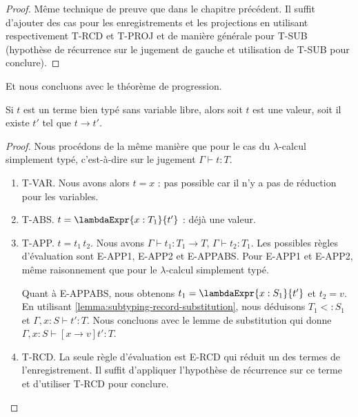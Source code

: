 \begin{proof}
  Même technique de preuve que dans le chapitre précédent. Il suffit d'ajouter 
  des cas pour les enregistrements et les projections en utilisant
  respectivement T-RCD et T-PROJ et de manière générale pour T-SUB (hypothèse de
  récurrence sur le jugement de gauche et utilisation de T-SUB pour conclure).
\end{proof}

Et nous concluons avec le théorème de progression.

\begin{theorem} 
  Si $t$ est un terme bien typé sans variable libre, alors soit $t$ est une
  valeur, soit il existe $t'$ tel que $t \rightarrow t'$.
\end{theorem}

\begin{proof}
  Nous procédons de la même manière que pour le cas du $\lambda$-calcul
  simplement typé, c'est-à-dire sur le jugement $\Gamma \vdash t : T$.
  \begin{enumerate}
    \item T-VAR. Nous avons alors $t = x$ : pas possible car il n'y a pas de
      réduction pour les variables.
      \item T-ABS. $t = \lambdaExpr{x : T_{1}}{t'}$ : déjà une valeur.
      \item T-APP. $t = t_{1} \, t_{2}$. Nous avons
          $\Gamma \vdash t_{1} : T_{1} \rightarrow T$, $\Gamma \vdash t_{2}
          : T_{1}$.
          Les possibles règles d'évaluation
          sont E-APP1, E-APP2 et E-APPABS. Pour E-APP1 et E-APP2, même
          raisonnement que pour le $\lambda$-calcul simplement typé.

          Quant à E-APPABS, nous obtenons $t_{1} = \lambdaExpr{x : S_{1}}{t'}$ et
          $t_{2} = v$. En utilisant \ref{lemma:subtyping-record-substitution},
          nous déduisons $T_{1} <: S_{1}$ et $\Gamma, x : S \vdash t' : T$. Nous
          concluons avec le lemme de substitution qui donne $\Gamma, x : S \vdash
          [x \rightarrow v]t' : T$.

       \item T-RCD. La seule règle d'évaluation est E-RCD qui réduit un des
         termes de l'enregistrement. Il suffit d'appliquer l'hypothèse de
         récurrence sur ce terme et d'utiliser T-RCD pour conclure.


\end{enumerate}
\end{proof}
